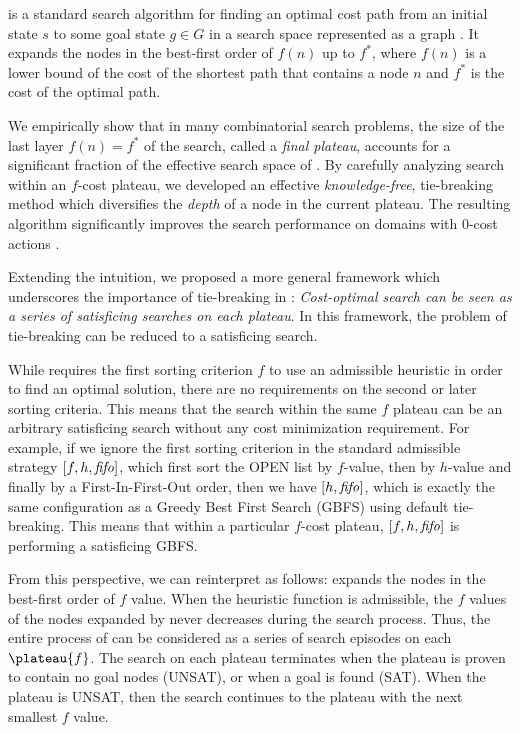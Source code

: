 \astar is a standard search algorithm for finding an optimal cost path from an initial state $s$ to
some goal state $g \in G$ in a search space represented as a graph \cite{hart1968formal}.
It expands the nodes in the best-first order of $f(n)$ up to $f^*$, where $f(n)$ is a lower bound of the
cost of the shortest path that contains a node $n$ and $f^*$ is the cost of the optimal path.

We empirically show that in many combinatorial search problems, the size of the last layer
$f(n)=f^*$ of the search, called a \emph{final plateau}, accounts for a significant fraction of the
effective search space of \astar.  By carefully analyzing search within an $f$-cost plateau, we
developed an effective {\it knowledge-free}, tie-breaking method which diversifies the \emph{depth}
of a node in the current plateau.  The resulting algorithm significantly improves the search
performance on domains with 0-cost actions \cite{Asai2016}. 

Extending the intuition, we proposed a more general framework which underscores the importance of
tie-breaking in \astar: \emph{Cost-optimal search can be seen as a series of satisficing searches on
each plateau}. In this framework, the problem of tie-breaking can be reduced to a
satisficing search.

While \astar requires the first sorting criterion $f$ to use an admissible heuristic in order to
find an optimal solution, there are no requirements on the second or later sorting criteria.
This means that the search within the same $f$ plateau can be an arbitrary satisficing
search without any cost minimization requirement. For example, if we ignore the first sorting
criterion in the standard admissible strategy $[f,h,{\text{\textit{fifo}}}]$, which first sort the OPEN list by
$f$-value, then by $h$-value and finally by a First-In-First-Out order, then we have $[h,{\text{\textit{fifo}}}]$, which
is exactly the same configuration as a Greedy Best First Search (GBFS) using \fifo default
tie-breaking. This means that within a particular $f$-cost plateau, $[f,h,{\text{\textit{fifo}}}]$ is performing a
satisficing GBFS.


From this perspective, we can reinterpret \astar as follows: \astar expands the
nodes in the best-first order of $f$ value. When the heuristic function is admissible, the $f$ values of
the nodes expanded by \astar never decreases during the search process.  Thus, the entire process of
\astar can be considered as a series of search episodes on each $\plateau{f}$.  The search on each
plateau terminates when the plateau is proven to contain no goal nodes (UNSAT), or when a goal is
found (SAT).  When the plateau is UNSAT, then the search continues to the plateau with the next
smallest $f$ value.


